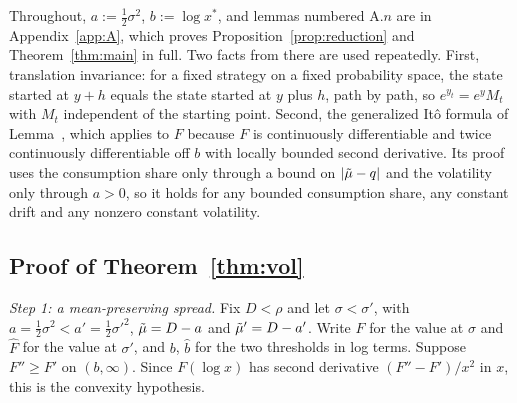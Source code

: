 Throughout, $a:=\tfrac12\sigma^2$, $b:=\log x^*$, and lemmas numbered A.$n$ are in Appendix~\ref{app:A}, which proves Proposition~\ref{prop:reduction} and Theorem~\ref{thm:main} in full. Two facts from there are used repeatedly. First, translation invariance: for a fixed strategy on a fixed probability space, the state started at $y+h$ equals the state started at $y$ plus $h$, path by path, so $e^{y_t}=e^yM_t$ with $M_t$ independent of the starting point. Second, the generalized It\^o formula of Lemma~, which applies to $F$ because $F$ is continuously differentiable and twice continuously differentiable off $b$ with locally bounded second derivative. Its proof uses the consumption share only through a bound on $|\tilde\mu-q|$ and the volatility only through $a>0$, so it holds for any bounded consumption share, any constant drift and any nonzero constant volatility.

\subsection*{Proof of Theorem~\ref{thm:vol}}

\emph{Step 1: a mean-preserving spread.} Fix $D<\rho$ and let $\sigma<\sigma'$, with $a=\tfrac12\sigma^2<a'=\tfrac12\sigma'^2$, $\tilde\mu=D-a$ and $\tilde\mu'=D-a'$. Write $F$ for the value at $\sigma$ and $\hat F$ for the value at $\sigma'$, and $b$, $\hat b$ for the two thresholds in log terms. Suppose $F''\ge F'$ on $(b,\infty)$. Since $F(\log x)$ has second derivative $(F''-F')/x^2$ in $x$, this is the convexity hypothesis.

